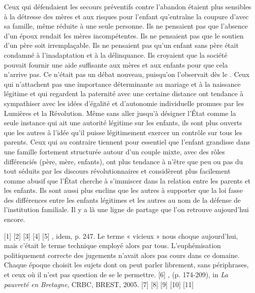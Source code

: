  Ceux qui défendaient les secours préventifs contre l'abandon étaient plus sensibles à la détresse des mères et aux risques pour l'enfant qu'entraîne la coupure d'avec sa famille, même réduite à une seule personne. Ils ne pensaient pas que l'absence d'un époux rendait les mères incompétentes. Ils ne pensaient pas que le soutien d'un père soit irremplaçable. Ils ne pensaient pas qu'un enfant sans père était condamné à l'inadaptation et à la délinquance. Ils croyaient que la société pouvait fournir une aide suffisante aux mères et aux enfants pour que cela n'arrive pas. Ce n'était pas un débat nouveau, puisqu'on l'observait dès le . Ceux qui n'attachent pas une importance déterminante au mariage et à la naissance légitime et qui regardent la paternité avec une certaine distance ont tendance à sympathiser avec les idées d'égalité et d'autonomie individuelle promues par les Lumières et la Révolution. Même sans aller jusqu'à désigner l'État comme la seule instance qui ait une autorité légitime sur les enfants, ils sont plus ouverts que les autres à l'idée qu'il puisse légitimement exercer un contrôle sur tous les parents. Ceux qui au contraire tiennent pour essentiel que l'enfant grandisse dans une famille fortement structurée autour d'un couple mixte, avec des rôles différenciés (père, mère, enfants), ont plus tendance à n'être que peu ou pas du tout séduits par les discours révolutionnaires et considèrent plus facilement comme abusif que l'État cherche à s'immiscer dans la relation entre les parents et les enfants. Ils sont aussi plus enclins que les autres à supporter que la loi fasse des différences entre les enfants légitimes et les autres au nom de la défense de l'institution familiale. Il y a là une ligne de partage que l'on retrouve aujourd'hui encore.
 
[1] 
[2] 
[3] 
[4] 
[5] , idem, p. 247. Le terme « vicieux » nous choque aujourd'hui, mais c'était le terme technique employé alors par tous. L'euphémisation politiquement correcte des jugements n'avait alors pas cours dans ce domaine. Chaque époque choisit les sujets dont on peut parler librement, sans périphrases, et ceux où il n'est pas question de se le permettre.
[6] ,  (p. 174-209), in \emph{La pauvreté en Bretagne}, CRBC, BREST, 2005.
[7] 
[8] 
[9]  
[10] 
[11] 
